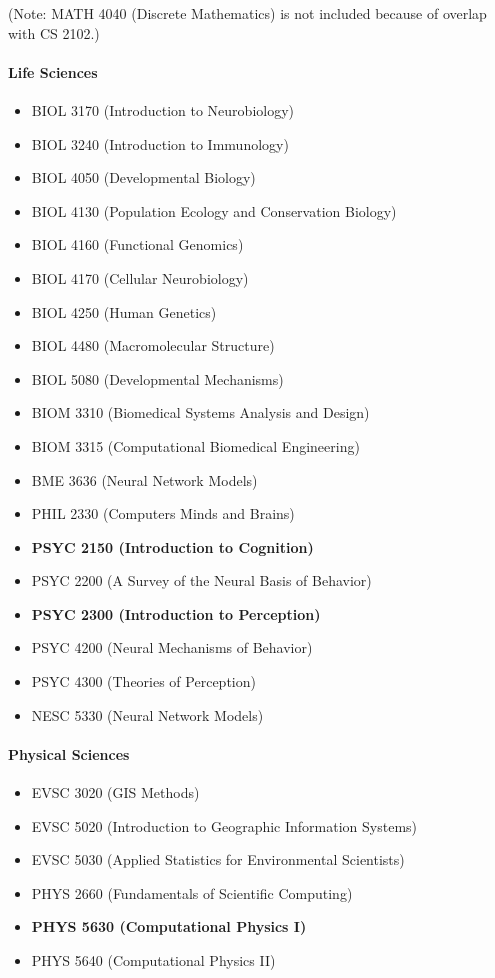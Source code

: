 \documentclass[10pt,letter]{book}
\newenvironment{itemlist}{
\begin{itemize}
\setlength{\itemsep}{0pt}
\setlength{\parskip}{0pt}}
{\end{itemize}}
\begin{document}
(Note: MATH 4040 (Discrete Mathematics) is not included because of
overlap with CS 2102.)

\paragraph{Life Sciences}
\begin{itemlist}
\item BIOL 3170 (Introduction to Neurobiology)
\item BIOL 3240 (Introduction to Immunology)
\item BIOL 4050 (Developmental Biology)
\item BIOL 4130 (Population Ecology and Conservation Biology)
\item BIOL 4160 (Functional Genomics)
\item BIOL 4170 (Cellular Neurobiology)
\item BIOL 4250 (Human Genetics)
\item BIOL 4480 (Macromolecular Structure)
\item BIOL 5080 (Developmental Mechanisms)
\item BIOM 3310 (Biomedical Systems Analysis and Design)
\item BIOM 3315 (Computational Biomedical Engineering)
\item BME 3636 (Neural Network Models)
\item PHIL 2330 (Computers Minds and Brains)
\item {\bf PSYC 2150 (Introduction to Cognition)}
\item PSYC 2200 (A Survey of the Neural Basis of Behavior)
\item {\bf PSYC 2300 (Introduction to Perception)}
\item PSYC 4200 (Neural Mechanisms of Behavior)
\item PSYC 4300 (Theories of Perception)
\item NESC 5330 (Neural Network Models)
\end{itemlist}

\paragraph{Physical Sciences}
\begin{itemlist}
\item EVSC 3020 (GIS Methods)
\item EVSC 5020 (Introduction to Geographic Information Systems)
\item EVSC 5030 (Applied Statistics for Environmental Scientists)
\item PHYS 2660 (Fundamentals of Scientific Computing)
\item {\bf PHYS 5630 (Computational Physics I)}
\item PHYS 5640 (Computational Physics II)
\end{itemlist}
\end{document}
